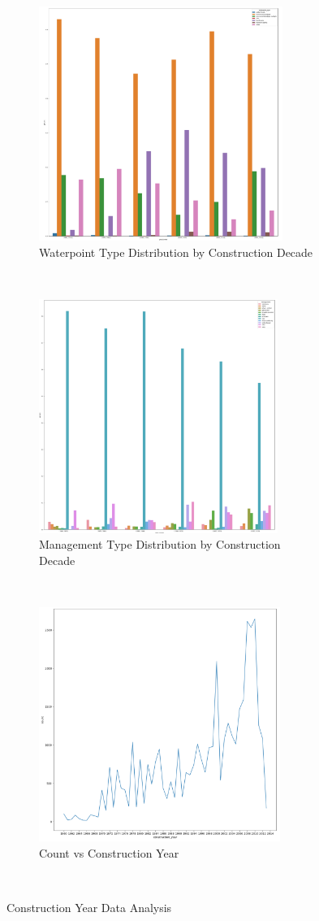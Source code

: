 \documentclass[conference]{IEEEtran}
\begin{document}
\begin{figure}[t!]
    \centering
    \begin{subfigure}[t]{0.5\textwidth}
        \centering
        \includegraphics[height=3in]{figures/tom_da_construction_year_1}
        \caption{Waterpoint Type Distribution by Construction Decade}
    \end{subfigure}%
    ~ 
    \begin{subfigure}[t]{0.5\textwidth}
        \centering
        \includegraphics[height=3in]{figures/tom_da_construction_year_2}
        \caption{Management Type Distribution by Construction Decade}
    \end{subfigure}
    ~
    \begin{subfigure}[t]{0.5\textwidth}
        \centering
        \includegraphics[height=3in]{figures/tom_da_construction_year_3}
        \caption{Count vs Construction Year}
    \end{subfigure}
    ~
    \caption{Construction Year Data Analysis}
    \label{fig:construction_year}
\end{figure}
    
\end{document}
